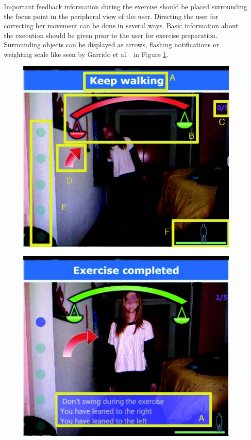 Important feedback information during the exercise should be placed surrounding the focus point in the peripheral view of the user. Directing the user for correcting her movement can be done in several ways. Basic information about the execution should be given prior to the user for exercise preparation. Surrounding objects can be displayed as arrows, flashing notifications or weighting scale like seen by Garrido et al.~\cite{Garrido2013-zs} in Figure \ref{fig:informationUISurroundingObjects}. 
\begin{figure}[htb]
	\centering
	\begin{minipage}[t]{0.49\linewidth}
		\centering
		\includegraphics[width=1\linewidth]{Pictures/informationUISurroundingObjects}
		\label{fig:informationUISurroundingObjects}
	\end{minipage}
	\hfill
	\begin{minipage}[t]{0.49\linewidth}
		\centering
		\includegraphics[width=1\linewidth]{Pictures/informationUIFeedbackSummary}

\end{minipage}
\end{figure}

